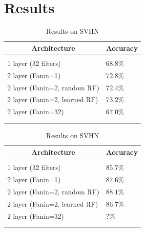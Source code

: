 \documentclass{article} %
\begin{document}
\section{Results}
\label{sec-results}



\begin {table}
\parbox{.5\linewidth}{
\caption{Results on CIFAR-10}
\label{resuts-cifar10}
\begin{center}
\begin{tabular}{ll}
\multicolumn{1}{c}{\bf Architecture}  &\multicolumn{1}{c}{\bf Accuracy}
\\ \hline \\
1 layer (32 filters)                            & $68.8\%$\\
2 layer (Fanin=1)                            &$72.8\%$ \\
2 layer (Fanin=2, random RF)            &$72.4\%$ \\
2 layer (Fanin=2, learned RF)            &$73.2\%$\\
2 layer (Fanin=32)                          &$67.0\%$\\
\\ \hline \\
\end{tabular}
\end{center}
}
\parbox{.5\linewidth}{
\caption{Results on SVHN}
\label{resuts-svhn}
\begin{center}
\begin{tabular}{ll}
\multicolumn{1}{c}{\bf Architecture}  &\multicolumn{1}{c}{\bf Accuracy}
\\ \hline \\
1 layer (32 filters)                          & $85.7\%$\\
2 layer (Fanin=1)                           &$87.6\%$ \\
2 layer (Fanin=2, random RF)           &$88.1\%$ \\
2 layer (Fanin=2, learned RF)           &$86.7\%$\\
2 layer (Fanin=32)                        &$?\%$\\
\\ \hline \\
\end{tabular}
\end{center}
}
\end{table}
\end{document}
